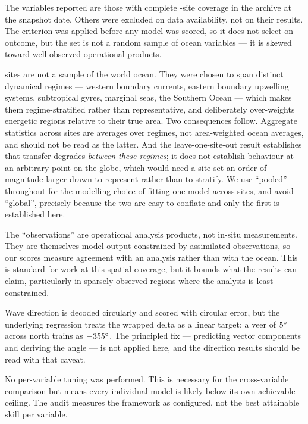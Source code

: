 The \NVars{} variables reported are those with complete \NSites{}-site coverage
in the archive at the snapshot date. Others were excluded on data availability,
not on their results. The criterion was applied before any model was scored, so
it does not select on outcome, but the set is not a random sample of ocean
variables --- it is skewed toward well-observed operational products.

\NSites{} sites are not a sample of the world ocean. They were chosen to span
distinct dynamical regimes --- western boundary currents, eastern boundary
upwelling systems, subtropical gyres, marginal seas, the Southern Ocean ---
which makes them regime-stratified rather than representative, and deliberately
over-weights energetic regions relative to their true area. Two consequences
follow. Aggregate statistics across sites are averages over regimes, not
area-weighted ocean averages, and should not be read as the latter. And the
leave-one-site-out result establishes that transfer degrades \emph{between
these regimes}; it does not establish behaviour at an arbitrary point on the
globe, which would need a site set an order of magnitude larger drawn to
represent rather than to stratify. We use ``pooled'' throughout for the
modelling choice of fitting one model across sites, and avoid ``global'',
precisely because the two are easy to conflate and only the first is
established here.

The ``observations'' are operational analysis products, not in-situ
measurements. They are themselves model output constrained by assimilated
observations, so our scores measure agreement with an analysis rather than with
the ocean. This is standard for work at this spatial coverage, but it bounds
what the results can claim, particularly in sparsely observed regions where the
analysis is least constrained.

Wave direction is decoded circularly and scored with circular error, but the
underlying regression treats the wrapped delta as a linear target: a veer of
$5^{\circ}$ across north trains as $-355^{\circ}$. The principled fix ---
predicting vector components and deriving the angle --- is not applied here,
and the direction results should be read with that caveat.

No per-variable tuning was performed. This is necessary for the cross-variable
comparison but means every individual model is likely below its own achievable
ceiling. The audit measures the framework as configured, not the best
attainable skill per variable.


